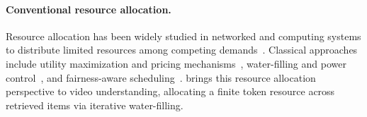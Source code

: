 \paragraph{Conventional resource allocation.}
Resource allocation has been widely studied in networked and computing systems to distribute limited resources among competing demands~\cite{kelly1998rate,low1999optimization,ghodsi2011dominant}. Classical approaches include utility maximization and pricing mechanisms~\cite{palomar2006tutorial,chiang2007layering}, water-filling and power control~\cite{goldsmith1997capacity,yu2004iwf,scutari2008asynchronous}, and fairness-aware scheduling~\cite{isard2009quincy,hindman2011mesos,grandl2014multi}. \name brings this resource allocation perspective to video understanding, allocating a finite token resource across retrieved items via iterative water-filling.

